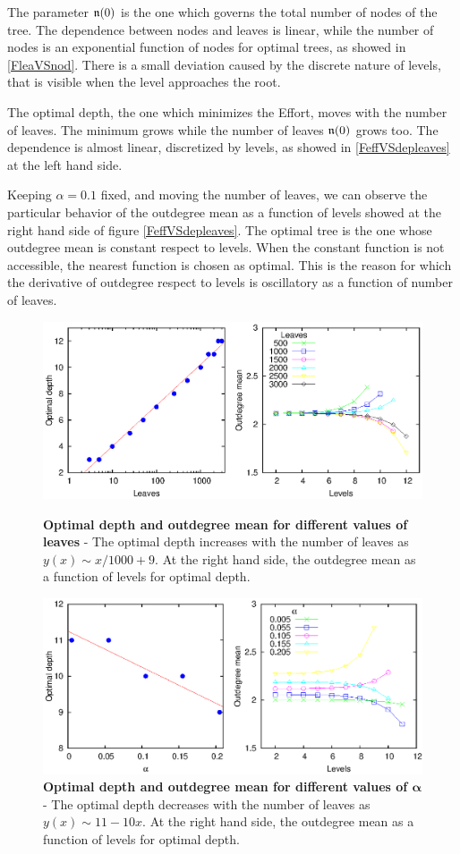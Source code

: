 The parameter $\mathfrak n(0)$ is the one which governs the total number of nodes of the tree. The dependence between nodes and leaves is linear, while the number of nodes is an exponential function of nodes for optimal trees, as showed in \ref{FleaVSnod}. There is a small deviation caused by the discrete nature of levels, that is visible when the level approaches the root.

The optimal depth, the one which minimizes the Effort, moves with the number of leaves. The minimum grows while the number of leaves $\mathfrak n(0)$ grows too. The dependence is almost linear, discretized by levels, as showed in \ref{FeffVSdepleaves} at the left hand side.

Keeping $\alpha=0.1$ fixed, and moving the number of leaves, we can observe the particular behavior of the outdegree mean as a function of levels showed at the right hand side of figure \ref{FeffVSdepleaves}. The optimal tree is the one whose outdegree mean is constant respect to levels. When the constant function is not accessible, the nearest function is chosen as optimal. This is the reason for which the derivative of outdegree respect to levels is oscillatory as a function of number of leaves.
\begin{figure}[p]%
\includegraphics[width=\textwidth,draft=false]{grafici/Mvarleaves.eps}
\caption{\label{FeffVSdepleaves} \footnotesize\textbf{Optimal depth and outdegree mean for different values of leaves} - The optimal depth increases with the number of leaves as $y(x) \sim x/1000 + 9$. At the right hand side, the outdegree mean as a function of levels for optimal depth.}
\vspace{1cm}
\includegraphics[width=\textwidth,draft=false]{grafici/Mvaralpha.eps}
\caption{\label{FeffVSdepalpha} \footnotesize\textbf{Optimal depth and outdegree mean for different values of $\boldsymbol{\alpha}$} - The optimal depth decreases with the number of leaves as $y(x) \sim 11 - 10x$. At the right hand side, the outdegree mean as a function of levels for optimal depth.}
\end{figure}

